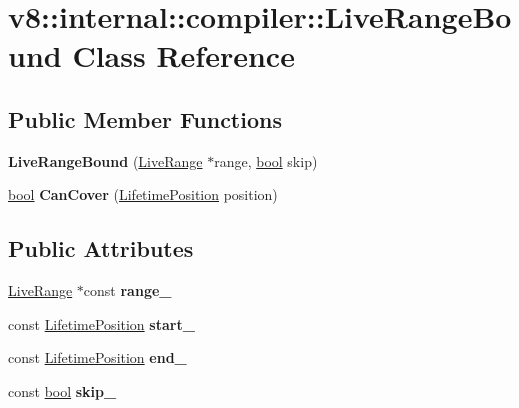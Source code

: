 \hypertarget{classv8_1_1internal_1_1compiler_1_1LiveRangeBound}{}\section{v8\+:\+:internal\+:\+:compiler\+:\+:Live\+Range\+Bound Class Reference}
\label{classv8_1_1internal_1_1compiler_1_1LiveRangeBound}
\subsection*{Public Member Functions}
\begin{DoxyCompactItemize}
\item 
\mbox{\label{classv8_1_1internal_1_1compiler_1_1LiveRangeBound_a245a3c9612ce8c1da5194c29b85a3378}} 
{\bfseries Live\+Range\+Bound} (\mbox{\hyperlink{classv8_1_1internal_1_1compiler_1_1LiveRange}{Live\+Range}} $\ast$range, \mbox{\hyperlink{classbool}{bool}} skip)
\item 
\mbox{\label{classv8_1_1internal_1_1compiler_1_1LiveRangeBound_af620a1d0b1cbeb07467819aa01891a44}} 
\mbox{\hyperlink{classbool}{bool}} {\bfseries Can\+Cover} (\mbox{\hyperlink{classv8_1_1internal_1_1compiler_1_1LifetimePosition}{Lifetime\+Position}} position)
\end{DoxyCompactItemize}
\subsection*{Public Attributes}
\begin{DoxyCompactItemize}
\item 
\mbox{\label{classv8_1_1internal_1_1compiler_1_1LiveRangeBound_a31adf66742f8c0b7101392328558ba8a}} 
\mbox{\hyperlink{classv8_1_1internal_1_1compiler_1_1LiveRange}{Live\+Range}} $\ast$const {\bfseries range\+\_\+}
\item 
\mbox{\label{classv8_1_1internal_1_1compiler_1_1LiveRangeBound_ad9828b4ba38126285be60185a0d3e0f8}} 
const \mbox{\hyperlink{classv8_1_1internal_1_1compiler_1_1LifetimePosition}{Lifetime\+Position}} {\bfseries start\+\_\+}
\item 
\mbox{\label{classv8_1_1internal_1_1compiler_1_1LiveRangeBound_a509a46a71e1d7606c1502d597c06fda5}} 
const \mbox{\hyperlink{classv8_1_1internal_1_1compiler_1_1LifetimePosition}{Lifetime\+Position}} {\bfseries end\+\_\+}
\item 
\mbox{\label{classv8_1_1internal_1_1compiler_1_1LiveRangeBound_a68eec38cf69856f02946373b3218d676}} 
const \mbox{\hyperlink{classbool}{bool}} {\bfseries skip\+\_\+}
\end{DoxyCompactItemize}


